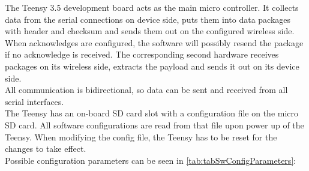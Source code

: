 %
\label{sec:txtSwConfig}
The Teensy 3.5 development board acts as the main micro controller. It collects data from the serial connections on device side, puts them into data packages with header and checksum and sends them out on the configured wireless side. When acknowledges are configured, the software will possibly resend the package if no acknowledge is received. The corresponding second hardware receives packages on its wireless side, extracts the payload and sends it out on its device side.\\
All communication is bidirectional, so data can be sent and received from all serial interfaces.\\
The Teensy has an on-board SD card slot with a configuration file on the micro SD card. All software configurations are read from that file upon power up of the Teensy. When modifying the config file, the Teensy has to be reset for the changes to take effect.\\
Possible configuration parameters can be seen in \autoref{tab:tabSwConfigParameters}:
%
